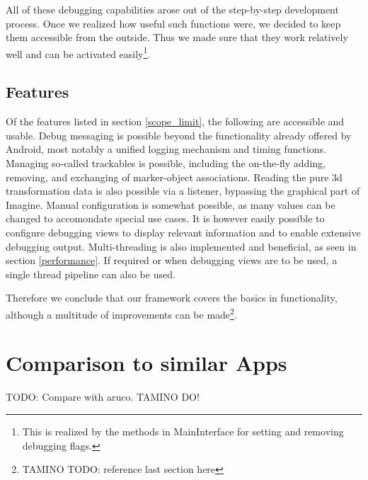 All of these debugging capabilities arose out of the step-by-step development process.
Once we realized how useful such functions were, we decided to keep them accessible from the outside.
Thus we made sure that they work relatively well and can be activated easily\footnote{This is realized by the methods in MainInterface for setting and removing debugging flags.}.

\subsection{Features}

Of the features listed in section \ref{scope_limit}, the following are accessible and usable.
Debug messaging is possible beyond the functionality already offered by Android, most notably a unified logging mechanism and timing functions.
Managing so-called trackables is possible, including the on-the-fly adding, removing, and exchanging of marker-object associations.
Reading the pure 3d transformation data is also possible via a listener, bypassing the graphical part of Imagine.
Manual configuration is somewhat possible, as many values can be changed to accomondate special use cases.
It is however easily possible to configure debugging views to display relevant information and to enable extensive debugging output.
Multi-threading is also implemented and beneficial, as seen in section \ref{performance}.
If required or when debugging views are to be used, a single thread pipeline can also be used.

Therefore we conclude that our framework covers the basics in functionality, although a multitude of improvements can be made\footnote{TAMINO TODO: reference last section here}.

\section{Comparison to similar Apps}

TODO: Compare with aruco. TAMINO DO!
